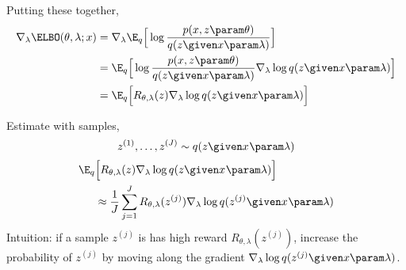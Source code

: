 \begin{frame}
Putting these together,
\begin{align*}
       \nabla_\lambda \ELBO(\theta, \lambda ; x) &=  \nabla_\lambda \E_q \Big[\log \frac{ p(x, z \param \theta)}{ q (z \given x \param \lambda)} \Big]\\
       &= \E_q \Big[\log \frac{p(x, z \param \theta)}{q(z \given x \param \lambda)} \nabla_\lambda \log q ( z \given x \param \lambda ) \Big] \\
       &= \E_q \Big[R_{\theta, \lambda}(z) \nabla_\lambda \log q ( z \given x \param \lambda ) \Big]
\end{align*}
\end{frame}

\begin{frame}
Estimate with samples,
\[ z^{(1)}, \dots, z^{(J)} \sim q(z \given x^{} \param \lambda) \]
\begin{align*}
        \E_{q}&\Big[ R_{\theta, \lambda}(z)  \nabla_\lambda \log q(z \given x^{} \param \lambda) \Big] \\ &\approx \frac{1}{J}\sum_{j=1}^J R_{\theta, \lambda}(z^{(j)})  \nabla_\lambda \log q(z^{(j)} \given x^{} \param \lambda)
\end{align*}
Intuition: if a sample $z^{(j)}$ is has high reward $R_{\theta, \lambda}(z^{(j)})$,
increase the probability of $z^{(j)}$
by moving along the gradient $\nabla_\lambda \log q(z^{(j)} \given x \param \lambda)$.
\end{frame}

